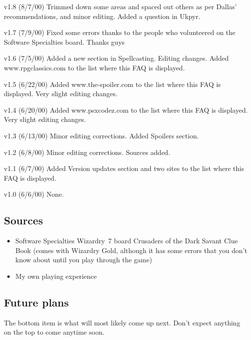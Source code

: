 \documentclass[12pt]{article}
\providecommand{\tightlist}{%
  \setlength{\itemsep}{0pt}\setlength{\parskip}{0pt}}
\newcommand{\indexPlace}[1]{\index{#1}}
\newcommand{\place}[1]{#1\indexPlace{#1}}
\begin{document}
v1.8 (8/7/00) Trimmed down some areas and spaced out others as per
Dallas' recommendations, and minor editing. Added a question in \place{Ukpyr}.

v1.7 (7/9/00) Fixed some errors thanks to the people who volunteered on
the Software Specialties board. Thanks guys

v1.6 (7/5/00) Added a new section in Spellcasting. Editing changes.
Added www.rpgclassics.com to the list where this FAQ is displayed.

v1.5 (6/22/00) Added www.the-spoiler.com to the list where this FAQ is
displayed. Very slight editing changes.

v1.4 (6/20/00) Added www.psxcodez.com to the list where this FAQ is
displayed. Very slight editing changes.

v1.3 (6/13/00) Minor editing corrections. Added Spoilers section.

v1.2 (6/8/00) Minor editing corrections. Sources added.

v1.1 (6/7/00) Added Version updates section and two sites to the list
where this FAQ is displayed.

v1.0 (6/6/00) None.

\subsection{Sources}\label{sources}

\begin{itemize}
\tightlist
\item Software Specialties Wizardry~7 board Crusaders of the Dark Savant Clue
Book (comes with Wizardry Gold, although it has some errors that you
don't know about until you play through the game)
\item My own playing experience
\end{itemize}

\subsection{Future plans}\label{future-plans}

The bottom item is what will most likely come up next.  Don't expect anything
on the top to come anytime soon.
\end{document}
